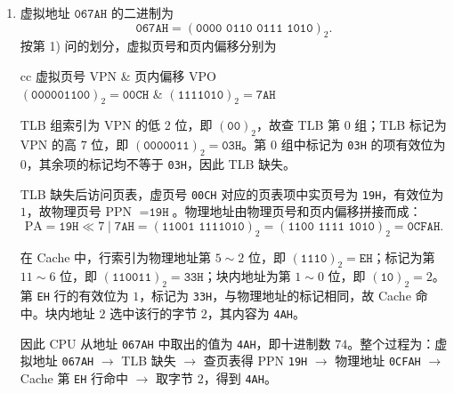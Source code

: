 \begin{problem}
\begin{solution}
\begin{enumerate}
            \item[\textbf{3)}] 虚拟地址 $\texttt{067AH}$ 的二进制为
            $$
            \texttt{067AH} = (\texttt{0000 0110 0111 1010})_2.
            $$
            按第 1) 问的划分，虚拟页号和页内偏移分别为
            \begin{center}
                \begin{mytable}{cc}
                    虚拟页号 VPN & 页内偏移 VPO \\
                    $(\texttt{000001100})_2 = \texttt{00CH}$ & $(\texttt{1111010})_2 = \texttt{7AH}$
                \end{mytable}
            \end{center}

            TLB 组索引为 VPN 的低 $2$ 位，即 $(\texttt{00})_2$，故查 TLB 第 $0$ 组；TLB 标记为 VPN 的高 $7$ 位，即 $(\texttt{0000011})_2=\texttt{03H}$。第 $0$ 组中标记为 \texttt{03H} 的项有效位为 $0$，其余项的标记均不等于 \texttt{03H}，因此 TLB 缺失。

            TLB 缺失后访问页表，虚页号 \texttt{00CH} 对应的页表项中实页号为 \texttt{19H}，有效位为 $1$，故物理页号 PPN $=\texttt{19H}$。物理地址由物理页号和页内偏移拼接而成：
            $$
            \mathrm{PA} = \texttt{19H} \ll 7 \mid \texttt{7AH} = (\texttt{11001 1111010})_2 = (\texttt{1100 1111 1010})_2 = \texttt{0CFAH}.
            $$

            在 Cache 中，行索引为物理地址第 $5\sim2$ 位，即 $(\texttt{1110})_2=\texttt{EH}$；标记为第 $11\sim6$ 位，即 $(\texttt{110011})_2=\texttt{33H}$；块内地址为第 $1\sim0$ 位，即 $(\texttt{10})_2=2$。第 \texttt{EH} 行的有效位为 $1$，标记为 \texttt{33H}，与物理地址的标记相同，故 Cache 命中。块内地址 $2$ 选中该行的字节 $2$，其内容为 \texttt{4AH}。

            因此 CPU 从地址 \texttt{067AH} 中取出的值为 \texttt{4AH}，即十进制数 $74$。整个过程为：虚拟地址 \texttt{067AH} $\to$ TLB 缺失 $\to$ 查页表得 PPN \texttt{19H} $\to$ 物理地址 \texttt{0CFAH} $\to$ Cache 第 \texttt{EH} 行命中 $\to$ 取字节 $2$，得到 \texttt{4AH}。
        \end{enumerate}
    \end{solution}
\end{problem}
